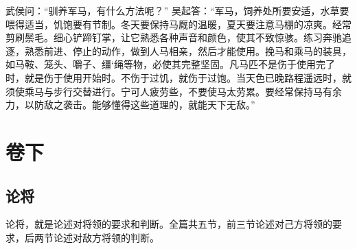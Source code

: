 \documentclass[a4paper,12pt,UTF8,twoside]{ctexbook}
\begin{document}
武侯问：“驯养军马，有什么方法呢？”
吴起答：“军马，饲养处所要安适，水草要喂得适当，饥饱要有节制。冬天要保持马厩的温暖，夏天要注意马棚的凉爽。经常剪刷鬃毛。细心铲蹄钉掌，让它熟悉各种声音和颜色，使其不致惊骇。练习奔驰追逐，熟悉前进、停止的动作，做到人马相亲，然后才能使用。挽马和乘马的装具，如马鞍、笼头、嚼子、缰‘绳等物，必使其完整坚固。凡马匹不是伤于使用完了时，就是伤于使用开始时。不伤于过饥，就伤于过饱。当天色已晚路程遥远时，就须使乘马与步行交替进行。宁可人疲劳些，不要使马太劳累。要经常保持马有余力，以防敌之袭击。能够懂得这些道理的，就能天下无敌。”

\part{卷下}

\chapter{论将}

论将，就是论述对将领的要求和判断。全篇共五节，前三节论述对己方将领的要求，后两节论述对敌方将领的判断。
\end{document}

